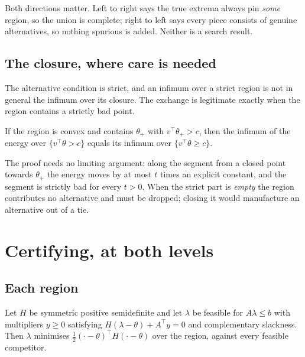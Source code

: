 Both directions matter. Left to right says the true extrema always pin \emph{some} region,
so the union is complete; right to left says every piece consists of genuine alternatives,
so nothing spurious is added. Neither is a search result.

\subsection{The closure, where care is needed}

The alternative condition is strict, and an infimum over a strict region is not in general
the infimum over its closure. The exchange is legitimate exactly when the region contains a
strictly bad point.

\begin{theorem}
\label{thm:closure}
If the region is convex and contains $\theta_{+}$ with $v^{\top}\theta_{+}>c$, then the
infimum of the energy over $\{v^{\top}\theta>c\}$ equals its infimum over
$\{v^{\top}\theta\ge c\}$.
\end{theorem}


The proof needs no limiting argument: along the segment from a closed point towards
$\theta_{+}$ the energy moves by at most $t$ times an explicit constant, and the segment is
strictly bad for every $t>0$. When the strict part is \emph{empty} the region contributes no
alternative and must be dropped; closing it would manufacture an alternative out of a tie.


\section{Certifying, at both levels}
\label{sec:cert}

\subsection{Each region}

\begin{theorem}
\label{thm:kkt}
Let $H$ be symmetric positive semidefinite and let $\lambda$ be feasible for $A\lambda\le b$
with multipliers $y\ge0$ satisfying $H(\lambda-\theta)+A^{\top}y=0$ and complementary
slackness. Then $\lambda$ minimises $\tfrac12(\cdot-\theta)^{\top}H(\cdot-\theta)$ over the
region, against every feasible competitor.
\end{theorem}

